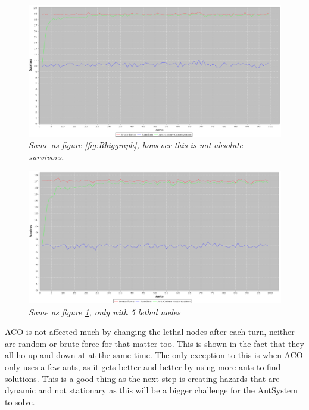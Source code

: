 \begin{figure} %
\hspace*{-1.5 cm}
\includegraphics[width=160mm]{images/Float40Nodes2Leathal2Exit.png}
\caption{\textit{Same as figure \ref{fig:Rbiggraph}, however this is not absolute survivors.}}
\label{fig:Rbiggraph2f}
\end{figure}


\begin{figure} %
\hspace*{-1.5 cm}
\includegraphics[width=160mm]{images/Float40Nodes5Leathal2Exit.png}
\caption{\textit{Same as figure \ref{fig:Rbiggraph2f}, only with 5 lethal nodes}}
\label{fig:Rbiggraph5f}
\end{figure}
\pagebreak


ACO is not affected much by changing the lethal nodes after each turn, neither are random or brute force for that matter too. This is shown in the fact that they all ho up and down at at the same time. The only exception to this is when ACO only uses a few ants, as it gets better and better by using more ants to find solutions. This is a good thing as the next step is creating hazards that are dynamic and not stationary as this will be a bigger challenge for the AntSystem to solve. 






